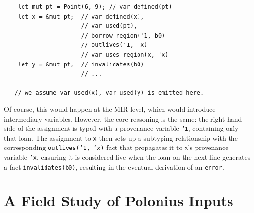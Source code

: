 \documentclass[11pt,a4paper,twoside,openany]{report}
\newenvironment{sourcecode}{\captionsetup{type=listing}}{}
\newcommand{\InRust}[1]{\texttt{#1}}
\newcommand{\InDatalog}[1]{\texttt{#1}}
\begin{document}
\begin{sourcecode}
  \label{lst:polonius-fact-emission}
\begin{verbatim}
    let mut pt = Point(6, 9); // var_defined(pt)
    let x = &mut pt;  // var_defined(x),
                      // var_used(pt),
                      // borrow_region('1, b0)
                      // outlives('1, 'x)
                      // var_uses_region(x, 'x)
    let y = &mut pt;  // invalidates(b0)
                      // ...

   // we assume var_used(x), var_used(y) is emitted here.
\end{verbatim}
\end{sourcecode}

Of course, this would happen at the MIR level, which would introduce
intermediary variables. However, the core reasoning is the same: the right-hand
side of the assignment is typed with a provenance variable \InRust{'1},
containing only that loan. The assignment to \InRust{x} then sets up a subtyping
relationship with the corresponding \InDatalog{outlives('1, 'x)} fact that
propagates it to \InRust{x}'s provenance variable \InRust{'x}, ensuring it is
considered live when the loan on the next line generates a fact
\InRust{invalidates(b0)}, resulting in the eventual derivation of an
\InRust{error}.

\section{A Field Study of Polonius Inputs}\label{sec:field-study-borrow}
\end{document}
